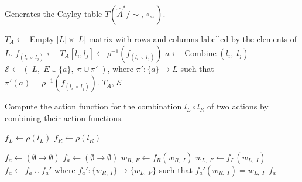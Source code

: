 \begin{algorithm}[H]
\begin{fullwidth}
\caption{
    Generates the Cayley table $T(\hat{A}^{*}/\sim, \circ_{\sim})$.
}
\label{alg:GenerateCayley}
\hrulefill
\begin{algorithmic}[1]
    \State $T_{A} \gets$ Empty $|L| \times |L|$ matrix with rows and columns labelled by the elements of $L$.
    \Statex {}
    \Statex {}
    \State $f_{(l_{i} \; \circ \; l_{j})} \gets$ 
    \Statex {}
    \State $T_{A}[l_{i}, l_{j}] \gets \rho^{-1}(f_{(l_{i} \; \circ \; l_{j})})$
    \Statex {}
        \State $a \gets \operatorname{Combine}(l_{i}, \; l_{j})$
        \State $\mathcal{E} \gets (\; L, \; E \cup \{a\}, \; \pi \cup \pi' \;)$, where $\pi': \{a\} \to L$ such that $\pi'(a) = \rho^{-1}(f_{(l_{i} \; \circ \; l_{j})})$.
    \EndIf
    \EndFor
    \EndFor
    \State \Return $T_{A}$, $\mathcal{E}$
    \EndProcedure
\end{algorithmic}
\end{fullwidth}
\end{algorithm}


\begin{algorithm}[H]
\begin{fullwidth}
\caption{
    Compute the action function for the combination $l_{L} \circ l_{R}$ of two actions by combining their action functions.
}
\hrulefill
\begin{algorithmic}[1]
    \Statex {}
    \State $f_{L} \gets \rho(l_{L})$
    \State $f_{R} \gets \rho(l_{R})$
    
    \State $f_{a} \gets (\emptyset \to \emptyset)$
    \Statex {}
    \State $f_{a} \gets (\emptyset \to \emptyset)$
    \State $w_{R, \; F} \gets f_{R}(w_{R, \; I})$
    \State $w_{L, \; F} \gets f_{L}(w_{L, \; I})$
    \State $f_{a} \gets f_{a} \cup f_{a}'$ where $f_{a}': \{w_{R, \; I}\} \to \{w_{L, \; F}\}$ such that $f_{a}'(w_{R, \; I}) = w_{L, \; F}$
    \EndIf
    \EndFor
    \EndFor
    \State \Return $f_{a}$
    \EndProcedure
\end{algorithmic}
\end{fullwidth}
\end{algorithm}

